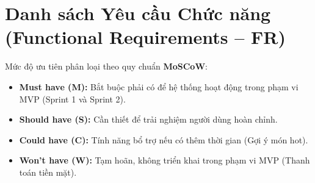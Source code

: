 \documentclass[12pt,a4paper]{article}
\begin{document}
\section{Danh sách Yêu cầu Chức năng (Functional Requirements -- FR)}

Mức độ ưu tiên phân loại theo quy chuẩn \textbf{MoSCoW}:
\begin{itemize}[itemsep=1pt]
    \item \textbf{Must have (M):} Bắt buộc phải có để hệ thống hoạt động trong phạm vi MVP (Sprint 1 và Sprint 2).
    \item \textbf{Should have (S):} Cần thiết để trải nghiệm người dùng hoàn chỉnh.
    \item \textbf{Could have (C):} Tính năng bổ trợ nếu có thêm thời gian (Gợi ý món hot).
    \item \textbf{Won't have (W):} Tạm hoãn, không triển khai trong phạm vi MVP (Thanh toán tiền mặt).
\end{itemize}
\end{document}
